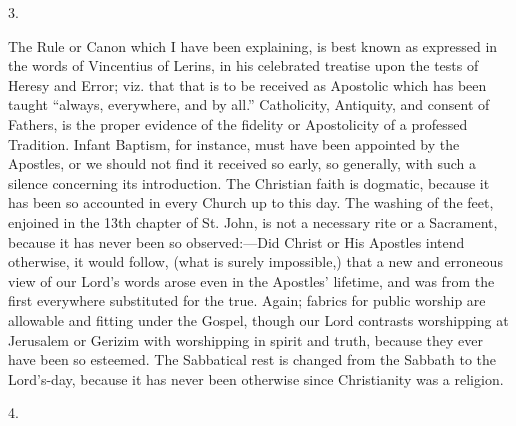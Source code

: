 3.

The Rule or Canon which I have been explaining, is best known as
expressed in the words of Vincentius of Lerins, in his celebrated
treatise upon the tests of Heresy and Error; viz. that that is to be
received as Apostolic which has been taught ``always, everywhere,
and by all.'' Catholicity, Antiquity, and consent of Fathers, is
the proper evidence of the fidelity or Apostolicity of a professed
Tradition. Infant Baptism, for instance, must have been appointed by
the Apostles, or we should not find it received so early, so
generally, with such a silence concerning its introduction. The
Christian faith is dogmatic, because it has been so accounted in every
Church up to this day. The washing of the feet, enjoined in the 13th
chapter of St. John, is not a necessary rite or a Sacrament, because
it has never been so observed:—Did Christ or His Apostles intend
otherwise, it would follow, (what is surely impossible,) that a new
and erroneous view of our Lord's words arose even in the Apostles'
lifetime, and was from the first everywhere substituted for the true.
Again; fabrics for public worship are allowable and fitting under the
Gospel, though our Lord contrasts worshipping at Jerusalem or Gerizim
with worshipping in spirit and truth, because they ever have been so
esteemed. The Sabbatical rest is changed from the Sabbath to the Lord's-day,
because it has never been otherwise since Christianity was a religion.

4.


